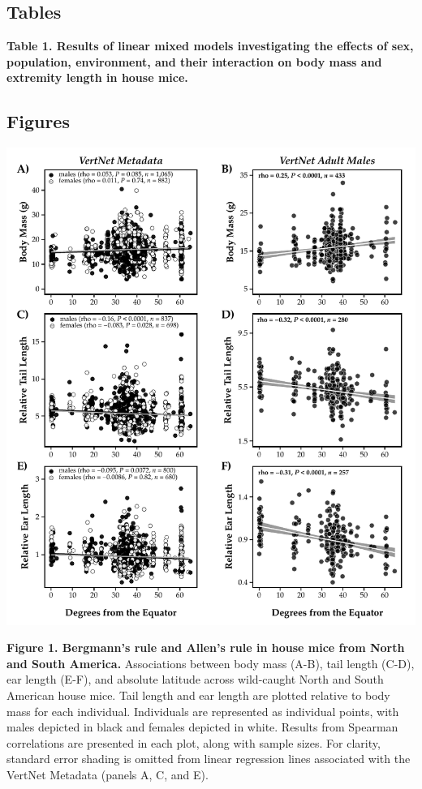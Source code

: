 \documentclass[
]{article}
\begin{document}
\setlength{\parindent}{0in}
\setlength{\leftskip}{0in}

\hypertarget{tables}{%
\subsection{Tables}\label{tables}}

\textbf{Table 1. Results of linear mixed models investigating the
effects of sex, population, environment, and their interaction on body
mass and extremity length in house mice.}

\newpage

\hypertarget{figures}{%
\subsection{Figures}\label{figures}}

\includegraphics{../results/figures/VertNet_relative.pdf}

\textbf{Figure 1. Bergmann's rule and Allen's rule in house mice from
North and South America.} Associations between body mass (A-B), tail
length (C-D), ear length (E-F), and absolute latitude across wild-caught
North and South American house mice. Tail length and ear length are
plotted relative to body mass for each individual. Individuals are
represented as individual points, with males depicted in black and
females depicted in white. Results from Spearman correlations are
presented in each plot, along with sample sizes. For clarity, standard
error shading is omitted from linear regression lines associated with
the VertNet Metadata (panels A, C, and E).
\end{document}
